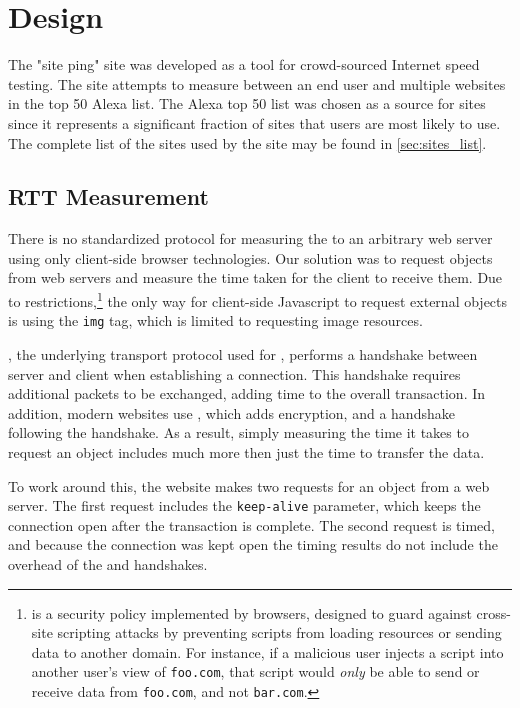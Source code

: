 \section{Design}\label{sec:design_web_ping}
The "site ping" site was developed as a tool for crowd-sourced Internet speed testing. The site attempts to measure \rtt between an end user and multiple websites in the top 50 Alexa list. The Alexa top 50 list was chosen as a source for sites since it represents a significant fraction of sites that users are most likely to use. The complete list of the sites used by the site may be found in \cref{sec:sites_list}.

\subsection{RTT Measurement}
There is no standardized protocol for measuring the \rtt to an arbitrary web server using only client-side browser technologies. Our solution was to request objects from web servers and measure the time taken for the client to receive them. Due to \cors restrictions,\footnote{\cors is a security policy implemented by browsers, designed to guard against cross-site scripting attacks by preventing scripts from loading resources or sending data to another domain. For instance, if a malicious user injects a script into another user's view of \texttt{foo.com}, that script would \textit{only} be able to send or receive data from \texttt{foo.com}, and not \texttt{bar.com}.} the only way for client-side Javascript to request external objects is using the \html \texttt{img} tag, which is limited to requesting image resources.

\TCP, the underlying transport protocol used for \http, performs a handshake between server and client when establishing a connection. This handshake requires additional packets to be exchanged, adding time to the overall transaction. In addition, modern websites use \httpse, which adds \tls encryption, and a \tls handshake following the \tcp handshake. As a result, simply measuring the time it takes to request an object includes much more then just the time to transfer the data.

To work around this, the website makes two requests for an object from a web server. The first request includes the \http \texttt{keep-alive} parameter, which keeps the \tcp connection open after the transaction is complete. The second request is timed, and because the connection was kept open the timing results do not include the overhead of the \tcp and \tls handshakes.

